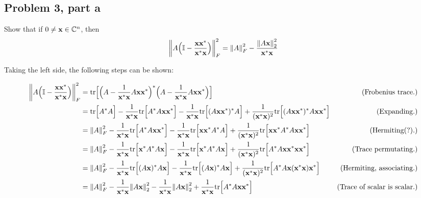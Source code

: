 \subsection{Problem 3, part a}
Show that if $0 \neq \textbf{x} \in \mathbb{C}^n$, then
\[
\norm{A\Big( \mathbb{I} - \frac{\textbf{x}\textbf{x}^*}{\textbf{x}^*\textbf{x}}\Big)}_F^2 = \norm{A}_F^2 - \frac{\norm{A\textbf{x}}_2^2}{\textbf{x}^*\textbf{x}}
\]
\partbreak
\begin{solution}

 Taking the left side, the following steps can be shown:

\vspace{-5mm}
 \alignbreak
 {\small
 \begin{align}
    \norm{A\Big( \id - \frac{\textbf{x}\textbf{x}^*}{\textbf{x}^*\textbf{x}}\Big)}^2_F &= \tr \Big[ \Big( A - \frac{1}{\textbf{x}^*\textbf{x}}A\textbf{x}\textbf{x}^*\Big)^*\Big( A - \frac{1}{\textbf{x}^*\textbf{x}}A\textbf{x}\textbf{x}^*\Big)\Big] &\text{(Frobenius trace.)}\nonumber\\
    &= \tr \Big[ A^*A\Big] - \frac{1}{\textbf{x}^*\textbf{x}} \tr \Big[ A^*A\textbf{x}\textbf{x}^*\Big] - \frac{1}{\textbf{x}^*\textbf{x}} \tr \Big[ (A\textbf{x}\textbf{x}^*)^*A\Big] + \frac{1}{(\textbf{x}^*\textbf{x})^2}\tr\Big[ (A\textbf{x}\textbf{x}^*)^*A\textbf{x}\textbf{x}^* \Big] &\text{(Expanding.)}\nonumber\\
    &= \norm{A}_F^2 - \frac{1}{\textbf{x}^*\textbf{x}} \tr \Big[ A^*A\textbf{x}\textbf{x}^*\Big] - \frac{1}{\textbf{x}^*\textbf{x}} \tr \Big[ \textbf{x}\textbf{x}^*A^*A\Big] + \frac{1}{(\textbf{x}^*\textbf{x})^2}\tr\Big[ \textbf{x}\textbf{x}^*A^*A\textbf{x}\textbf{x}^* \Big] &\text{(Hermiting(?).)}\nonumber\\
    &= \norm{A}_F^2 - \frac{1}{\textbf{x}^*\textbf{x}} \tr \Big[ \textbf{x}^*A^*A\textbf{x}\Big] - \frac{1}{\textbf{x}^*\textbf{x}} \tr \Big[ \textbf{x}^*A^*A\textbf{x}\Big] + \frac{1}{(\textbf{x}^*\textbf{x})^2}\tr\Big[ A^*A\textbf{x}\textbf{x}^* \textbf{x}\textbf{x}^*\Big] &\text{(Trace permutating.)}\nonumber\\
    &= \norm{A}_F^2 - \frac{1}{\textbf{x}^*\textbf{x}} \tr \Big[ (A\textbf{x})^*A\textbf{x}\Big] - \frac{1}{\textbf{x}^*\textbf{x}} \tr \Big[ (A\textbf{x})^*A\textbf{x}\Big] + \frac{1}{(\textbf{x}^*\textbf{x})^2}\tr\Big[ A^*A\textbf{x}(\textbf{x}^* \textbf{x})\textbf{x}^*\Big] &\text{(Hermiting, associating.)}\nonumber\\
    &= \norm{A}_F^2 - \frac{1}{\textbf{x}^*\textbf{x}} \norm{A\textbf{x}}_2^2 - \frac{1}{\textbf{x}^*\textbf{x}} \norm{A\textbf{x}}_2^2 + \frac{1}{\textbf{x}^*\textbf{x}}\tr\Big[ A^*A\textbf{x}\textbf{x}^*\Big] &\text{(Trace of scalar is scalar.)}\nonumber\\

\end{align}}
\end{solution}
